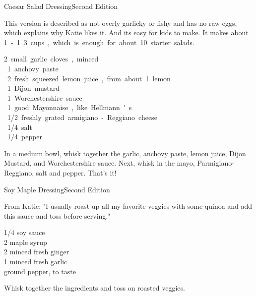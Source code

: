 \begin{entry}{Caesar Salad Dressing}{Second Edition}

\begin{open}
  This version is described as not overly garlicky or fishy and has no raw eggs, which explains why Katie likes it. And its easy for kids to make. It makes about \SI{1}-\SI{1}{3} cups, which is enough for about 10 starter salads.
\end{open}
\begin{ingredients}
  \SI{2} small garlic cloves, minced \\
  \SI{1}{\teaspoon} anchovy paste \\
  \SI{2}{\tblspoon} fresh squeezed lemon juice, from about 1 lemon \\
  \SI{1}{\teaspoon} Dijon mustard \\
  \SI{1}{\teaspoon} Worchestershire sauce \\
  \SI{1}{\cup} good Mayonnaise, like Hellmann's \\
  \SI{1/2}{\cup} freshly grated armigiano-Reggiano cheese \\
  \SI{1/4}{\teaspoon} salt \\
  \SI{1/4}{\teaspoon} pepper 
 
\end{ingredients}

In a medium bowl, whisk together the garlic, anchovy paste, lemon juice, Dijon Mustard, and Worchestershire sauce. Next, whisk in the mayo, Parmigiano-Reggiano, salt and pepper. That's it!

\end{entry}

\begin{entry}{Soy Maple Dressing}{Second Edition}

\begin{open}
   From Katie: "I usually roast up all my favorite veggies with some quinoa and add this sauce and toss before serving."
\end{open}
\begin{ingredients}
  \SI{1/4}{\cup} soy sauce \\
  \SI{2}{\tblspoon} maple syrup \\
  \SI{2}{\teaspoon} minced fresh ginger \\
  \SI{1}{\teaspoon} minced fresh garlic \\
   ground pepper, to taste
\end{ingredients}

Whisk together the ingredients and toss on roasted veggies. 

\end{entry}

